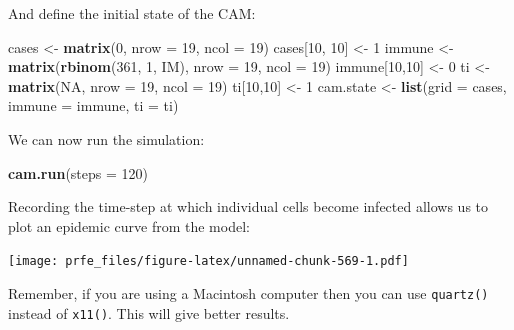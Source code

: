 \documentclass[12pt,a4paper]{book}
\newenvironment{Shaded}{\begin{snugshade}}{\end{snugshade}}
\newcommand{\KeywordTok}[1]{\textcolor[rgb]{0.13,0.29,0.53}{\textbf{#1}}}
\newcommand{\DataTypeTok}[1]{\textcolor[rgb]{0.13,0.29,0.53}{#1}}
\newcommand{\DecValTok}[1]{\textcolor[rgb]{0.00,0.00,0.81}{#1}}
\newcommand{\StringTok}[1]{\textcolor[rgb]{0.31,0.60,0.02}{#1}}
\newcommand{\OtherTok}[1]{\textcolor[rgb]{0.56,0.35,0.01}{#1}}
\newcommand{\OperatorTok}[1]{\textcolor[rgb]{0.81,0.36,0.00}{\textbf{#1}}}
\newcommand{\NormalTok}[1]{#1}
\theoremstyle{definition}
\theoremstyle{definition}
\theoremstyle{definition}
\theoremstyle{remark}
\begin{document}
And define the initial state of the CAM:

\begin{Shaded}
\begin{Highlighting}[]
\NormalTok{cases <-}\StringTok{ }\KeywordTok{matrix}\NormalTok{(}\DecValTok{0}\NormalTok{, }\DataTypeTok{nrow =} \DecValTok{19}\NormalTok{, }\DataTypeTok{ncol =} \DecValTok{19}\NormalTok{)}
\NormalTok{cases[}\DecValTok{10}\NormalTok{, }\DecValTok{10}\NormalTok{] <-}\StringTok{ }\DecValTok{1}
\NormalTok{immune <-}\StringTok{ }\KeywordTok{matrix}\NormalTok{(}\KeywordTok{rbinom}\NormalTok{(}\DecValTok{361}\NormalTok{, }\DecValTok{1}\NormalTok{, IM), }\DataTypeTok{nrow =} \DecValTok{19}\NormalTok{, }\DataTypeTok{ncol =} \DecValTok{19}\NormalTok{)}
\NormalTok{immune[}\DecValTok{10}\NormalTok{,}\DecValTok{10}\NormalTok{] <-}\StringTok{ }\DecValTok{0}
\NormalTok{ti <-}\StringTok{ }\KeywordTok{matrix}\NormalTok{(}\OtherTok{NA}\NormalTok{, }\DataTypeTok{nrow =} \DecValTok{19}\NormalTok{, }\DataTypeTok{ncol =} \DecValTok{19}\NormalTok{)}
\NormalTok{ti[}\DecValTok{10}\NormalTok{,}\DecValTok{10}\NormalTok{] <-}\StringTok{ }\DecValTok{1}
\NormalTok{cam.state <-}\StringTok{ }\KeywordTok{list}\NormalTok{(}\DataTypeTok{grid =}\NormalTok{ cases, }\DataTypeTok{immune =}\NormalTok{ immune, }\DataTypeTok{ti =}\NormalTok{ ti)}
\end{Highlighting}
\end{Shaded}

We can now run the simulation:

\begin{Shaded}
\begin{Highlighting}[]
\KeywordTok{cam.run}\NormalTok{(}\DataTypeTok{steps =} \DecValTok{120}\NormalTok{)}
\end{Highlighting}
\end{Shaded}

Recording the time-step at which individual cells become infected allows
us to plot an epidemic curve from the model:

\begin{Shaded}
\end{Shaded}

\texttt{[image: prfe\_files/figure-latex/unnamed-chunk-569-1.pdf]}

Remember, if you are using a Macintosh computer then you can use
\texttt{quartz()} instead of \texttt{x11()}. This will give better
results.
\end{document}
